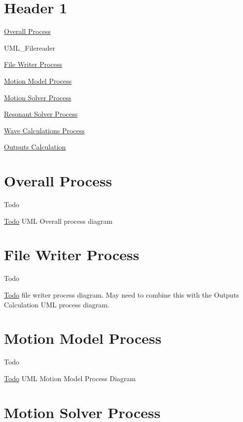 \section*{Header 1}

\hyperlink{UML_Overall}{Overall Process}

U\-M\-L\-\_\-\-Filereader

\hyperlink{UML_WritingFiles}{File Writer Process}

\hyperlink{UML_MotionModel}{Motion Model Process}

\hyperlink{UML_MotionSolver}{Motion Solver Process}

\hyperlink{UML_ResonantSolver}{Resonant Solver Process}

\hyperlink{UML_WaveCalculation}{Wave Calculations Process}

\hyperlink{UML_OutputsCalculation}{Outputs Calculation} \hypertarget{UML_Overall}{}\section{Overall Process}\label{UML_Overall}
\begin{DoxyRefDesc}{Todo}
\item[\hyperlink{todo__todo000005}{Todo}]U\-M\-L Overall process diagram\end{DoxyRefDesc}
\hypertarget{UML_WritingFiles}{}\section{File Writer Process}\label{UML_WritingFiles}
\begin{DoxyRefDesc}{Todo}
\item[\hyperlink{todo__todo000008}{Todo}]file writer process diagram. May need to combine this with the Outputs Calculation U\-M\-L process diagram.\end{DoxyRefDesc}
\hypertarget{UML_MotionModel}{}\section{Motion Model Process}\label{UML_MotionModel}
\begin{DoxyRefDesc}{Todo}
\item[\hyperlink{todo__todo000002}{Todo}]U\-M\-L Motion Model Process Diagram\end{DoxyRefDesc}
\hypertarget{UML_MotionSolver}{}\section{Motion Solver Process}\label{UML_MotionSolver}
